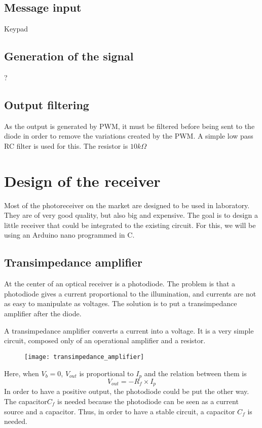 \documentclass[12pt]{report}
\begin{document}
\subsection{Message input}

Keypad

\subsection{Generation of the signal}

?

\subsection{Output filtering}

As the output is generated by PWM, it must be filtered before being sent to the diode in order to remove the variations created by the PWM. A simple low pass RC filter is used for this.
The resistor is $10k\Omega$



\section{Design of the receiver}

Most of the photoreceiver on the market are designed to be used in laboratory. They are of very good quality, but also big and expensive. The goal is to design a little receiver that could be integrated to the existing circuit.
For this, we will be using an Arduino nano programmed in C.

\subsection{Transimpedance amplifier}

At the center of an optical receiver is a photodiode. The problem is that a photodiode gives a current proportional to the illumination, and currents are not as easy to manipulate as voltages. The solution is to put a transimpedance amplifier after the diode.

A transimpedance amplifier converts a current into a voltage. It is a very simple circuit, composed only of an operational amplifier and a resistor.

\begin{figure}[h]
\centering
\texttt{[image: transimpedance\_amplifier]}
\end{figure}

Here, when $V_b = 0$, $V_{out}$ is proportional to $I_p$ and the relation between them is $$V_{out} = - R_f \times I_p$$
In order to have a positive output, the photodiode could be put the other way.
The capacitor$ C_f$ is needed because the photodiode can be seen as a current source and a capacitor. Thus, in order to have a stable circuit, a capacitor $C_f$ is needed.
\end{document}
